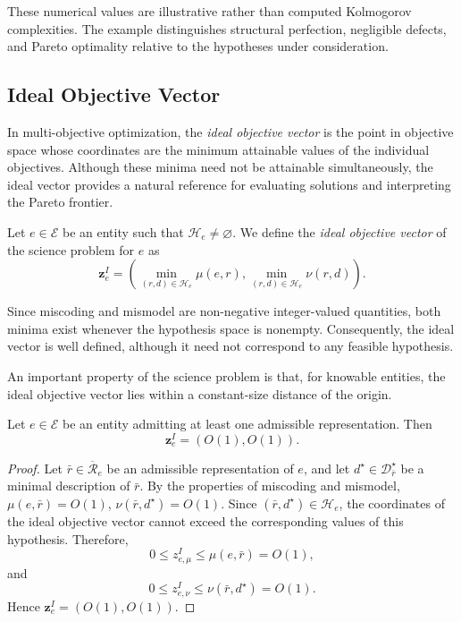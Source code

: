 These numerical values are illustrative rather than computed Kolmogorov complexities. The example distinguishes structural perfection, negligible defects, and Pareto optimality relative to the hypotheses under consideration.


\subsection*{Ideal Objective Vector}
\label{sec:ideal_objective_vector}

In multi-objective optimization, the \emph{ideal objective vector}  is the point in objective space whose coordinates are the minimum attainable values of the individual objectives. Although these minima need not be attainable simultaneously, the ideal vector provides a natural reference for evaluating solutions and interpreting the Pareto frontier.

\begin{definition}
Let $e\in\mathcal E$ be an entity such that $\mathcal H_e\neq\varnothing$. We define the \emph{ideal objective vector} of the science problem for $e$ as
\[
\mathbf z_e^I = \left(\min_{(r,d)\in\mathcal H_e}\mu(e,r), \min_{(r,d)\in\mathcal H_e}\nu(r,d) \right).
\]
\end{definition}

Since miscoding and mismodel are non-negative integer-valued quantities, both minima exist whenever the hypothesis space is nonempty. Consequently, the ideal vector is well defined, although it need not correspond to any feasible hypothesis.

An important property of the science problem is that, for knowable entities, the ideal objective vector lies within a constant-size distance of the origin.

\begin{proposition}
Let $e\in\mathcal E$ be an entity admitting at least one admissible representation. Then
\[
\mathbf z_e^I=(O(1),O(1)).
\]
\end{proposition}

\begin{proof}
Let $\bar r\in\overline{\mathcal R}_e$ be an admissible representation of $e$, and let $d^\star\in\mathcal D_{\bar r}^\star$ be a minimal description of $\bar r$. By the properties of miscoding and mismodel, $\mu(e,\bar r)=O(1)$, $\nu(\bar r,d^\star)=O(1)$. Since $(\bar r,d^\star)\in\mathcal H_e$, the coordinates of the ideal objective vector cannot exceed the corresponding values of this hypothesis. Therefore,
\[
0\leq z_{e,\mu}^I\leq\mu(e,\bar r)=O(1),
\]
and
\[
0\leq z_{e,\nu}^I\leq\nu(\bar r,d^\star)=O(1).
\]
Hence $\mathbf z_e^I=(O(1),O(1))$.
\end{proof}

